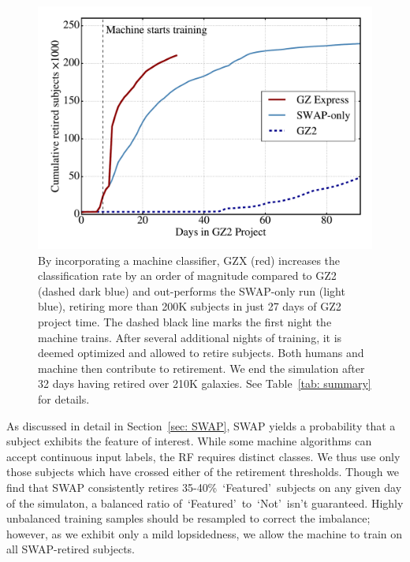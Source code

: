 \documentclass[twocolumn]{aastex6}%
\newcommand{\feat}{`Featured'}
\newcommand{\notfeat}{`Not'}
\begin{document}
\begin{figure}[t!]
\centering
\includegraphics[width=5.5in]{f7.pdf}
\caption{By incorporating a machine classifier, GZX (red) increases the classification rate by an order of magnitude compared to GZ2 (dashed dark blue) and out-performs the SWAP-only run (light blue), retiring more than 200K subjects in just 27 days of GZ2 project time. The dashed black line marks the first night the machine trains. After several additional nights of training, it is deemed optimized and allowed to retire subjects. Both humans and machine then contribute to retirement. We end the simulation after 32 days having retired over 210K galaxies. See Table~\ref{tab: summary} for details. \label{fig: money}}
\end{figure}


As discussed in detail in Section~\ref{sec: SWAP}, SWAP yields a probability that 
a subject exhibits the feature of interest. While some machine algorithms can 
accept continuous input labels, the RF requires distinct classes. We thus use only 
those subjects which have crossed either of the retirement thresholds. 
Though we find that SWAP consistently retires 35-40\%~\feat~subjects on 
any given day of the simulaton, a balanced ratio of~\feat~to~\notfeat~isn't guaranteed.
 Highly unbalanced training samples should be resampled to correct the imbalance; 
however, as we exhibit only a mild lopsidedness, we allow the machine to train on all 
SWAP-retired subjects.  
\end{document}
